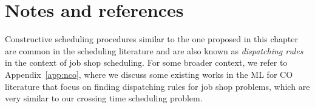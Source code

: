 \documentclass[a4paper]{report}
\theoremstyle{definition}
\theoremstyle{plain}
\begin{document}
% 
% 


%

\section{Notes and references}

Constructive scheduling procedures similar to the one proposed in this chapter
are common in the scheduling literature and are also known as \emph{dispatching
  rules} in the context of job shop scheduling. For some broader context, we
refer to Appendix~\ref{app:nco}, where we discuss some existing works in the ML for CO
literature that focus on finding dispatching rules for job shop problems, which
are very similar to our crossing time scheduling problem.

\end{document}
